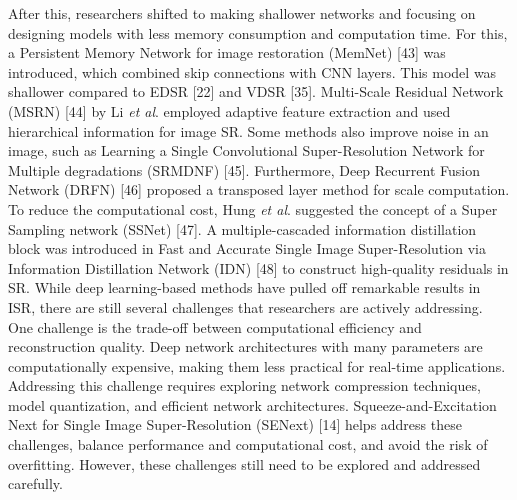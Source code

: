 \documentclass{ieeeaccess}
\begin{document}
After this, researchers shifted to making shallower networks and focusing on designing models with less memory consumption and computation time. For this, a Persistent Memory Network for image restoration (MemNet) [43] was introduced, which combined skip connections with CNN layers. This model was shallower compared to EDSR [22] and VDSR [35]. Multi-Scale Residual Network (MSRN) [44] by Li \textit{et al}. employed adaptive feature extraction and used hierarchical information for image SR. Some methods also improve noise in an image, such as Learning a Single Convolutional Super-Resolution Network for Multiple degradations (SRMDNF) [45]. Furthermore, Deep Recurrent Fusion Network (DRFN) [46] proposed a transposed layer method for scale computation. To reduce the computational cost, Hung \textit{et al}. suggested the concept of a Super Sampling network (SSNet) [47]. A multiple-cascaded information distillation block was introduced in Fast and Accurate Single Image Super-Resolution via Information Distillation Network (IDN) [48] to construct high-quality residuals in SR.
While deep learning-based methods have pulled off remarkable results in ISR, there are still several challenges that researchers are actively addressing. One challenge is the trade-off between computational efficiency and reconstruction quality. Deep network architectures with many parameters are computationally expensive, making them less practical for real-time applications. Addressing this challenge requires exploring network compression techniques, model quantization, and efficient network architectures. Squeeze-and-Excitation Next for Single Image Super-Resolution (SENext) [14] helps address these challenges, balance performance and computational cost, and avoid the risk of overfitting. However, these challenges still need to be explored and addressed carefully.
\end{document}
